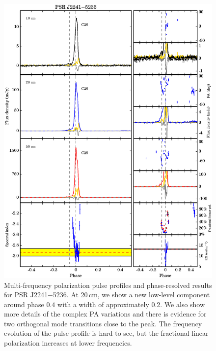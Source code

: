 \documentclass[useAMS,usenatbib]{mn2e}
\begin{document}
\begin{appendix}
\begin{figure}
\begin{center}
\includegraphics[width=6 in]{2241.ps}
\caption{Multi-frequency polarization pulse profiles and phase-resolved results for PSR J2241$-$5236. 
At 20\,cm, we show a new low-level component around phase $0.4$ with a width of 
approximately 0.2.
%
We also show more details of the complex PA variations and there is evidence 
for two orthogonal mode transitions close to the peak.
%
The frequency evolution of the pulse profile is hard to see, but the fractional 
linear polarization increases at lower frequencies.
}
\label{2241}
\end{center}
\end{figure}

\end{appendix}
\end{document}

